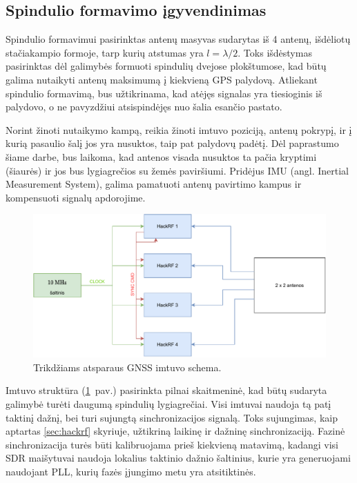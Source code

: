 \documentclass[main.tex]{subfiles}
\begin{document}
\subsection{Spindulio formavimo įgyvendinimas}\label{sec:beamforming_concept}

Spindulio formavimui pasirinktas antenų masyvas sudarytas iš 4 antenų, išdėliotų
stačiakampio formoje, tarp kurių atstumas yra $l=\lambda / 2$. Toks
išdėstymas pasirinktas dėl galimybės formuoti spindulių dvejose plokštumose,
kad būtų galima nutaikyti antenų maksimumą į kiekvieną GPS palydovą.
Atliekant spindulio formavimą, bus užtikrinama, kad atėjęs signalas yra
tiesioginis iš palydovo, o ne pavyzdžiui atsispindėjęs nuo šalia esančio pastato.

Norint žinoti nutaikymo kampą, reikia žinoti imtuvo poziciją, antenų pokrypį,
ir į kurią pasaulio šalį jos yra nusuktos, taip pat palydovų padėtį.
Dėl paprastumo šiame darbe,
bus laikoma, kad antenos visada nusuktos ta pačia kryptimi (šiaurės)
ir jos bus lygiagrečios su žemės paviršiumi. Pridėjus IMU (angl. Inertial Measurement
System), galima pamatuoti antenų pavirtimo kampus ir kompensuoti signalų apdorojime.

\begin{figure}[h]
    \begin{centering}
    \includegraphics[scale=0.8]{drawings/beamformer_diagram}
    \par\end{centering}
    \protect\caption{\label{fig:gnss_beamform_block}Trikdžiams atsparaus GNSS imtuvo schema.}
\end{figure}

Imtuvo struktūra (\ref{fig:gnss_beamform_block}~pav.) pasirinkta pilnai skaitmeninė,
kad būtų sudaryta galimybė turėti daugumą
spindulių lygiagrečiai. Visi imtuvai naudoja tą patį taktinį dažnį, bei turi sujungtą
sinchronizacijos signalą. Toks sujungimas, kaip aptartas \ref{sec:hackrf} skyriuje,
užtikriną laikinę ir dažninę sinchronizaciją. Fazinė sinchronizacija turės būti
kalibruojama prieš kiekvieną matavimą, kadangi visi SDR maišytuvai naudoja lokalius
taktinio dažnio šaltinius, kurie yra generuojami naudojant PLL, kurių fazės
įjungimo metu yra atsitiktinės.
\end{document}
